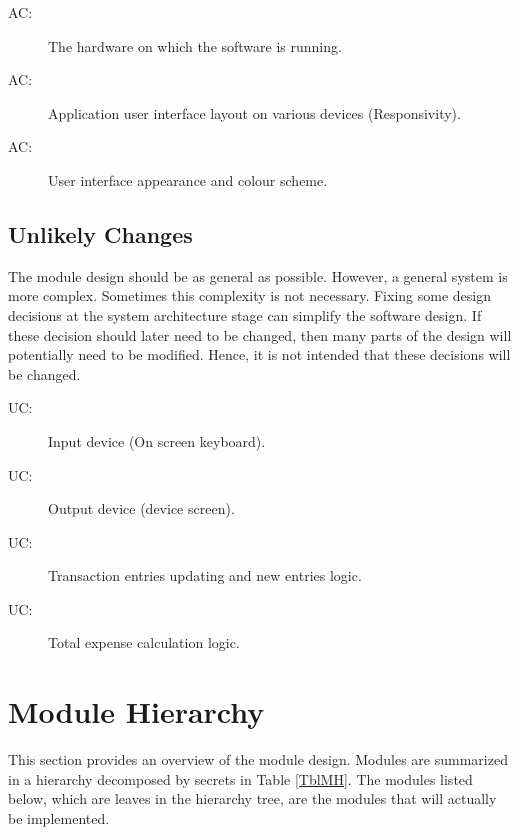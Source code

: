 \documentclass[12pt, titlepage]{article}
\newcounter{acnum}
\newcommand{\actheacnum}{AC\theacnum}
\newcounter{ucnum}
\newcommand{\uctheucnum}{UC\theucnum}
\begin{document}
\begin{description}
\item[ \actheacnum \label{ac1}:] The hardware on which the software is running.
\item[ \actheacnum \label{ac2}:] Application user interface layout on various devices (Responsivity).
\item[ \actheacnum \label{ac3}:] User interface appearance and colour scheme.
\end{description}

\subsection{Unlikely Changes} \label{SecUchange}

The module design should be as general as possible. However, a general system is
more complex. Sometimes this complexity is not necessary. Fixing some design
decisions at the system architecture stage can simplify the software design. If
these decision should later need to be changed, then many parts of the design
will potentially need to be modified. Hence, it is not intended that these
decisions will be changed.

\begin{description}
\item[ \uctheucnum \label{uc1}:] Input device (On screen keyboard).
\item[ \uctheucnum \label{uc2}:] Output device (device screen).
\item[ \uctheucnum \label{uc3}:] Transaction entries updating and new entries logic.
\item[ \uctheucnum \label{uc4}:] Total expense calculation logic.
\end{description}

\section{Module Hierarchy} \label{SecMH}

This section provides an overview of the module design. Modules are summarized
in a hierarchy decomposed by secrets in Table \ref{TblMH}. The modules listed
below, which are leaves in the hierarchy tree, are the modules that will
actually be implemented.
\end{document}
